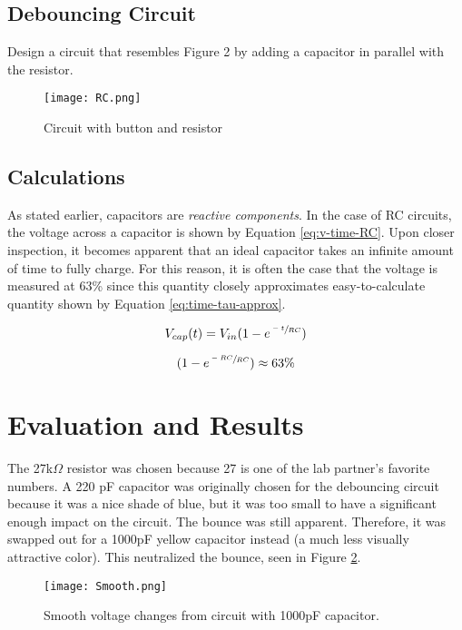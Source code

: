 \documentclass{hitec}
\begin{document}
	\subsection{Debouncing Circuit}
	Design a circuit that resembles Figure 2 by adding a capacitor in parallel with the resistor. 
	\begin{figure}[h]
		\texttt{[image: RC.png]}
		\caption{Circuit with button and resistor}
		\label{fig:ResistorCircuit}
	\end{figure}
	\subsection{Calculations}
	As stated earlier, capacitors are \textit{reactive components}. In the case of RC circuits, the voltage across a capacitor is shown by Equation \ref{eq:v-time-RC}. Upon closer inspection, it becomes apparent that an ideal capacitor takes an infinite amount of time to fully charge. For this reason, it is often the case that the voltage is measured at 63\% since this quantity closely approximates easy-to-calculate quantity shown by Equation \ref{eq:time-tau-approx}.
	
	\begin{equation}
		V_{cap}(t)=V_{in}(1 - e^{\sfrac{-t}{RC}})
		\label{eq:v-time-RC}
	\end{equation}
	
	\begin{equation}
		(1-e^{\sfrac{-RC}{RC}})\approx63\%
		\label{eq:time-tau-approx}
	\end{equation}
	
	
	\section{Evaluation and Results}
	
	The 27k$\Omega$ resistor was chosen because 27 is one of the lab partner's favorite numbers. A 220 pF capacitor was originally chosen for the debouncing circuit because it was a nice shade of blue, but it was too small to have a significant enough impact on the circuit. The bounce was still apparent. Therefore, it was swapped out for a 1000pF yellow capacitor instead (a much less visually attractive color). This neutralized the bounce, seen in Figure \ref{fig:smooth}.
	
	\begin{figure}[h]
		\centering
		\texttt{[image: Smooth.png]}
		\caption{Smooth voltage changes from circuit with 1000pF capacitor.}
		\label{fig:smooth}
	\end{figure}
	
\end{document}
